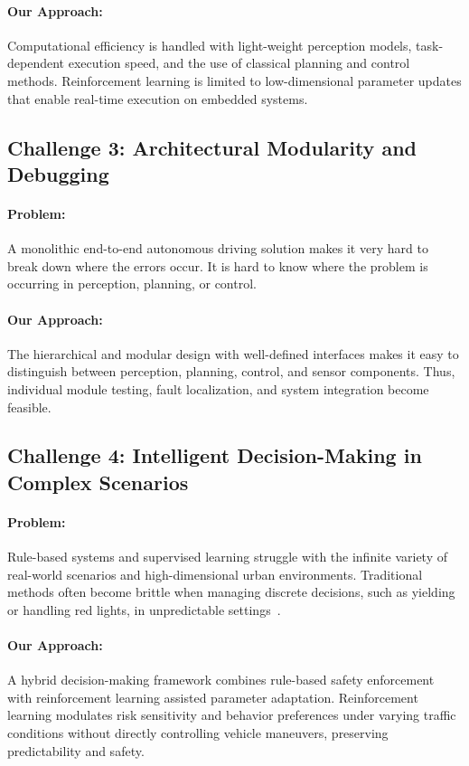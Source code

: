 \documentclass[12pt, a4paper]{report}
\begin{document}
\paragraph{Our Approach:}
Computational efficiency is handled with light-weight perception models, task-dependent execution speed, and the use of classical planning and control methods. Reinforcement learning is limited to low-dimensional parameter updates that enable real-time execution on embedded systems.

\subsection{Challenge 3: Architectural Modularity and Debugging}

\paragraph{Problem:}
A monolithic end-to-end autonomous driving solution makes it very hard to break down where the errors occur. It is hard to know where the problem is occurring in perception, planning, or control.

\paragraph{Our Approach:}
The hierarchical and modular design with well-defined interfaces makes it easy to distinguish between perception, planning, control, and sensor components. Thus, individual module testing, fault localization, and system integration become feasible.

\subsection{Challenge 4: Intelligent Decision-Making in Complex Scenarios}

\paragraph{Problem:}
Rule-based systems and supervised learning struggle with the infinite variety of real-world scenarios and high-dimensional urban environments. Traditional methods often become brittle when managing discrete decisions, such as yielding or handling red lights, in unpredictable settings~\cite{ref3}.

\paragraph{Our Approach:}
A hybrid decision-making framework combines rule-based safety enforcement with reinforcement learning assisted parameter adaptation. Reinforcement learning modulates risk sensitivity and behavior preferences under varying traffic conditions without directly controlling vehicle maneuvers, preserving predictability and safety.
\end{document}
